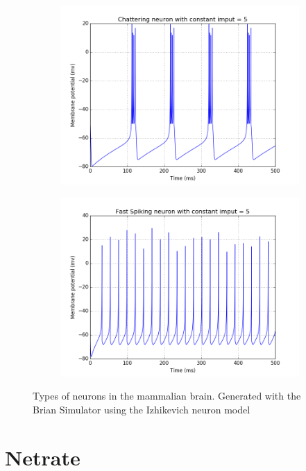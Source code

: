 \begin{figure}
\begin{subfigure}[b]{0.49\textwidth}
		\includegraphics[width=\textwidth]{chattering.png}
	\end{subfigure}
	\begin{subfigure}[b]{0.49\textwidth}
		\includegraphics[width=\textwidth]{fast_spiking.png}
	\end{subfigure}
  \caption{Types of neurons in the mammalian brain. Generated with the Brian Simulator \cite{10.3389/neuro.01.026.2009} using the Izhikevich neuron model \cite{izhikevich2003simple}}
	\label{fig:types_neurons}
\end{figure}


\section{Netrate}

